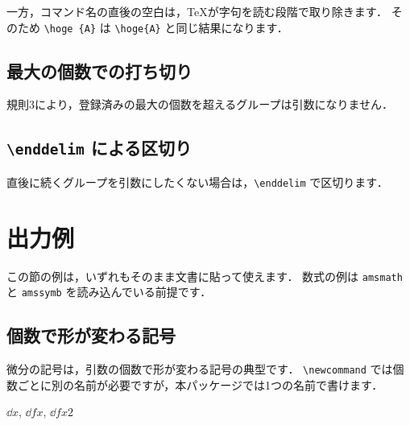 \documentclass[lualatex,ja = standard,a4paper,11pt]{bxjsarticle}
\begin{document}
一方，コマンド名の直後の空白は，\TeX が字句を読む段階で取り除きます．
そのため \verb|\hoge {A}| は \verb|\hoge{A}| と同じ結果になります．

\subsection{最大の個数での打ち切り}

規則3により，登録済みの最大の個数を超えるグループは引数になりません．

\begin{example}
\newoverload{\hoge}

\end{example}

\subsection{\texttt{\textbackslash enddelim} による区切り}\label{sec:enddelim}

直後に続くグループを引数にしたくない場合は，\verb|\enddelim| で区切ります．

\begin{example}
\newoverload{\hoge}

\end{example}

\section{出力例}

この節の例は，いずれもそのまま文書に貼って使えます．
数式の例は \texttt{amsmath} と \texttt{amssymb} を読み込んでいる前提です．

\subsection{個数で形が変わる記号}

微分の記号は，引数の個数で形が変わる記号の典型です．
\verb|\newcommand| では個数ごとに別の名前が必要ですが，本パッケージでは1つの名前で書けます．

\begin{example}
\newoverload{\dd}

$\dd{x}$,\quad
$\dd{f}{x}$,\quad
$\dd{f}{x}{2}$
\end{example}
\end{document}
